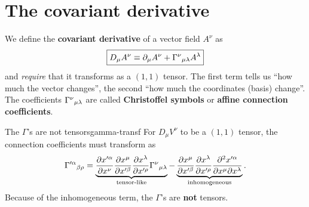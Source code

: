 \section{The covariant derivative}

We define the \textbf{covariant derivative} of a vector field $A^\nu$ as
\begin{equation}
  \boxed{D_\mu A^\nu\equiv\partial_\mu A^\nu+\Gamma^{\nu}{}_{\mu\lambda}A^\lambda}
  \label{eq:cov-der-vector}
\end{equation}
and \emph{require} that it transforms as a $(1,1)$ tensor. The first term tells us ``how much the vector changes'', the second ``how much the coordinates (basis) change''. The coefficients $\Gamma^{\nu}{}_{\mu\lambda}$ are called \textbf{Christoffel symbols} or \textbf{affine connection coefficients}.

\begin{proposition}{The $\Gamma$'s are not tensors}{gamma-transf}
For $D_\mu V^\nu$ to be a $(1,1)$ tensor, the connection coefficients must transform as
\begin{equation}
  \Gamma'^{\alpha}{}_{\beta\rho}=
  \underbrace{\frac{\partial x'^\alpha}{\partial x^\nu}\frac{\partial x^\mu}{\partial x'^\beta}\frac{\partial x^\lambda}{\partial x'^\rho}\Gamma^{\nu}{}_{\mu\lambda}}_{\text{tensor-like}}
  -\underbrace{\frac{\partial x^\mu}{\partial x'^\beta}\frac{\partial x^\lambda}{\partial x'^\rho}\frac{\partial^2x'^\alpha}{\partial x^\mu\partial x^\lambda}}_{\text{inhomogeneous}} .
  \label{eq:gamma-transf}
\end{equation}
Because of the inhomogeneous term, the $\Gamma$'s are \textbf{not} tensors.
\end{proposition}
